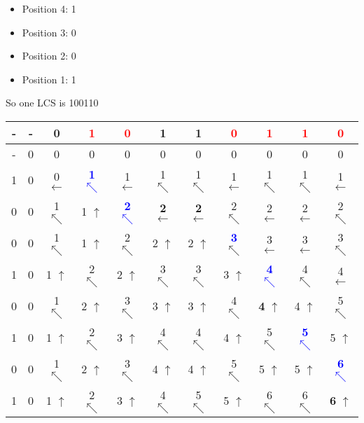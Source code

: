 \documentclass[11pt]{article}
\begin{document}
\begin{enumerate}
\begin{itemize}
        \item Position 4: 1
        \item Position 3: 0
        \item Position 2: 0
        \item Position 1: 1
    \end{itemize}
    So one LCS is 100110 \\
    \begin{tabular}{ c | c c c c c c c c c c } 
        - & - & 0 & \textcolor{red}{1} & \textcolor{red}{0} & 1 & 1 & \textcolor{red}{0} & \textcolor{red}{1} & \textcolor{red}{1} & \textcolor{red}{0} \\
        \hline
        - & 0 & 0 & 0 & 0 & 0 & 0 & 0 & 0 & 0 & 0 \\
        1 & 0 & 0 $\leftarrow$ & \textcolor{blue}{\textbf{1} $\nwarrow$} & 1 $\leftarrow$ & 1 $\nwarrow$ & 1 $\nwarrow$ & 1 $\leftarrow$ & 1 $\nwarrow$ & 1 $\nwarrow$ & 1 $\leftarrow$ \\
        0 & 0 & 1 $\nwarrow$ & 1 $\uparrow$ & \textcolor{blue}{\textbf{2} $\nwarrow$} & \textbf{2} $\leftarrow$ & \textbf{2} $\leftarrow$ & 2 $\nwarrow$ & 2 $\leftarrow$ & 2 $\leftarrow$ & 2 $\nwarrow$ \\
        0 & 0 & 1 $\nwarrow$ & 1 $\uparrow$ & 2 $\nwarrow$ & 2 $\uparrow$ & 2 $\uparrow$ & \textcolor{blue}{\textbf{3}} $\nwarrow$ & 3 $\leftarrow$ & 3 $\leftarrow$ & 3 $\nwarrow$ \\
        1 & 0 & 1 $\uparrow$ & 2 $\nwarrow$ & 2 $\uparrow$ & 3 $\nwarrow$ & 3 $\nwarrow$ & 3 $\uparrow$ & \textcolor{blue}{\textbf{4} $\nwarrow$} & 4 $\nwarrow$ & 4 $\leftarrow$ \\
        0 & 0 & 1 $\nwarrow$ & 2 $\uparrow$ & 3 $\nwarrow$ & 3 $\uparrow$ & 3 $\uparrow$ & 4 $\nwarrow$ & \textbf{4} $\uparrow$ & 4 $\uparrow$ & 5 $\nwarrow$ \\
        1 & 0 & 1 $\uparrow$ & 2 $\nwarrow$ & 3 $\uparrow$ & 4 $\nwarrow$ & 4 $\nwarrow$ & 4 $\uparrow$ & 5 $\nwarrow$ & \textcolor{blue}{\textbf{5} $\nwarrow$} & 5 $\uparrow$ \\
        0 & 0 & 1 $\nwarrow$ & 2 $\uparrow$ & 3 $\nwarrow$ & 4 $\uparrow$ & 4 $\uparrow$ & 5 $\nwarrow$ & 5 $\uparrow$ & 5 $\uparrow$ & \textcolor{blue}{\textbf{6} $\nwarrow$} \\
        1 & 0 & 1 $\uparrow$ & 2 $\nwarrow$ & 3 $\uparrow$ & 4 $\nwarrow$ & 5 $\nwarrow$ & 5 $\uparrow$ & 6 $\nwarrow$ & 6 $\nwarrow$ & \textbf{6} $\uparrow$ \\
    \end{tabular}

\end{enumerate}
\end{document}
